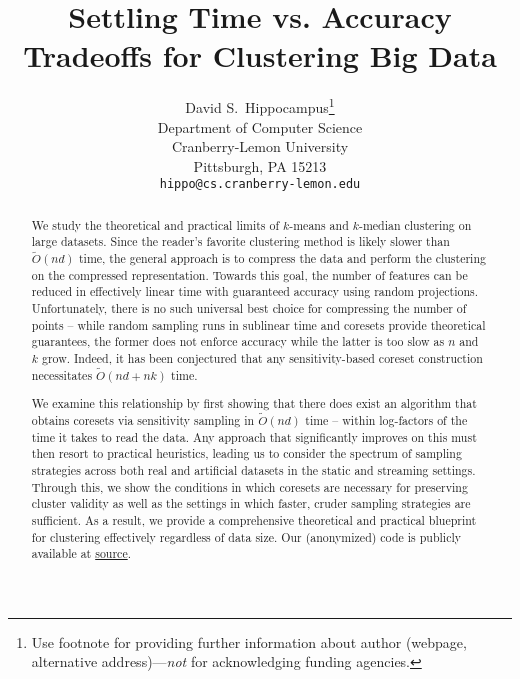 \documentclass{article}
\title{Settling Time vs. Accuracy Tradeoffs for Clustering Big Data}
\author{%
  David S.~Hippocampus\thanks{Use footnote for providing further information
    about author (webpage, alternative address)---\emph{not} for acknowledging
    funding agencies.} \\
  Department of Computer Science\\
  Cranberry-Lemon University\\
  Pittsburgh, PA 15213 \\
  \texttt{hippo@cs.cranberry-lemon.edu} \\
}
\theoremstyle{plain}
\theoremstyle{definition}
\theoremstyle{remark}
\begin{document}
\maketitle


\begin{abstract}
We study the theoretical and practical limits of $k$-means and $k$-median clustering on large datasets. Since the reader's favorite clustering method is likely
slower than $\tilde{O}(nd)$ time, the general approach is to compress the data and perform the clustering on the compressed representation. Towards this goal,
the number of features can be reduced in effectively linear time with guaranteed accuracy using random projections. Unfortunately, there is no such universal
best choice for compressing the number of points -- while random sampling runs in sublinear time and coresets provide theoretical guarantees, the former does
not enforce accuracy while the latter is too slow as $n$ and $k$ grow. Indeed, it has been conjectured that any sensitivity-based coreset construction
necessitates $\tilde{O}(nd + nk)$ time.

We examine this relationship by first showing that there does exist an algorithm that obtains coresets via sensitivity sampling in $\tilde{O}(nd)$ time --
within log-factors of the time it takes to read the data.  Any approach that significantly improves on this must then resort to practical heuristics, leading us
to consider the spectrum of sampling strategies across both real and artificial datasets in the static and streaming settings. Through this, we show the
conditions in which coresets are necessary for preserving cluster validity as well as the settings in which faster, cruder sampling strategies are sufficient.
As a result, we provide a comprehensive theoretical and practical blueprint for clustering effectively regardless of data size.  Our (anonymized) code is
publicly available at \textcolor{blue}{\href{https://anonymous.4open.science/r/Fast-Coreset-Generation-7564}{source}}.
\end{abstract}




%

%









\newpage
\appendix

\end{document}
